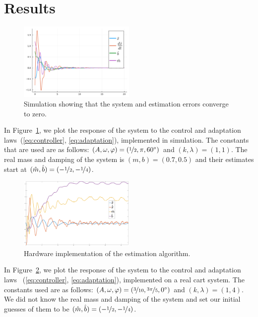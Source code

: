\section{Results}
\label{sec:results}

\begin{figure}[t]
  \centering
  \includegraphics[width=0.5\textwidth]{./figures/adaptationrule2.pdf}
  \caption{Simulation showing that the system and estimation errors converge to
  zero.}
  \label{fig:adaptation}
\end{figure}

In Figure~\ref{fig:adaptation}, we plot the response of the system to the
control and adaptation laws~(\ref{eq:controller}, \ref{eq:adaptation}),
implemented in simulation. The constants that are used are as follows: $(A,
\omega, \varphi) = (\nicefrac{1}{2}, \pi, 60^\circ)$ and $(k, \lambda) = (1,
1)$. The real mass and damping of the system is $(m, b) = (0.7, 0.5)$ and their
estimates start at $(\hat{m}, \hat{b}) = (-\nicefrac{1}{2}, -\nicefrac{1}{4})$.

\begin{figure}[b]
  \centering
  \includegraphics[width=0.5\textwidth]{./figures/station2_adaptation.eps}
  \caption{Hardware implementation of the estimation algorithm.}
  \label{fig:hardware}
\end{figure}

In Figure~\ref{fig:hardware}, we plot the response of the system to the control
and adaptation laws ~(\ref{eq:controller}, \ref{eq:adaptation}), implemented on
a real cart system. The constants used are as follows: $(A, \omega, \varphi) =
(\nicefrac{3}{10}, \nicefrac{3\pi}{5}, 0^\circ)$ and $(k, \lambda) = (1, 4)$. We
did not know the real mass and damping of the system and set our initial guesses
of them to be $(\hat{m}, \hat{b}) = (-\nicefrac{1}{2}, -\nicefrac{1}{4})$.

